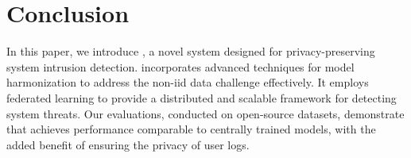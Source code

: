 \section{Conclusion}
\label{sec:conclusion}

In this paper, we introduce \Sys, a novel system designed for privacy-preserving system intrusion detection. \Sys incorporates advanced techniques for model harmonization to address the non-iid data challenge effectively. It employs federated learning to provide a distributed and scalable framework for detecting system threats. Our evaluations, conducted on open-source datasets, demonstrate that \Sys achieves performance comparable to centrally trained models, with the added benefit of ensuring the privacy of user logs.